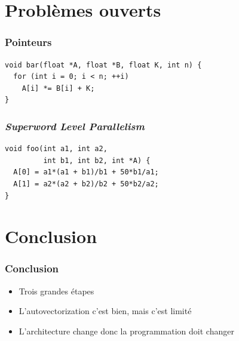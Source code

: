 \documentclass{beamer}
\begin{document}
\section{Problèmes ouverts}

\begin{frame}[fragile]
\frametitle{Pointeurs}
\begin{lstlisting}
void bar(float *A, float *B, float K, int n) {
  for (int i = 0; i < n; ++i)
    A[i] *= B[i] + K;
}
\end{lstlisting}
\end{frame}

\begin{frame}[fragile]
\frametitle{\textit{Superword Level Parallelism}}
\begin{lstlisting}
void foo(int a1, int a2, 
         int b1, int b2, int *A) {
  A[0] = a1*(a1 + b1)/b1 + 50*b1/a1;
  A[1] = a2*(a2 + b2)/b2 + 50*b2/a2;
}
\end{lstlisting}
\end{frame}

\section{Conclusion}
\begin{frame}
\frametitle{Conclusion}
\begin{itemize}
\item Trois grandes étapes
\item<2-> L'autovectorization c'est bien, mais c'est limité
\item<3-> L'architecture change donc la programmation doit changer
\end{itemize}
\end{frame}
\end{document}

